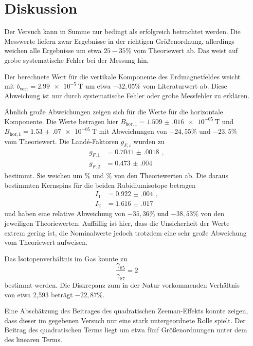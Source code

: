 \newpage
\section{Diskussion}
\label{sec:Diskussion}

Der Versuch kann in Summe nur bedingt als erfolgreich betrachtet werden. Die Messwerte
liefern zwar Ergebnisse in der richtigen Größenordnung, allerdings weichen alle Ergebnisse um
etwa $25-35\%$ vom Theoriewert ab. Das weist auf grobe systematische Fehler bei der Messung hin.

Der berechnete Wert für die vertikale Komponente des Erdmagnetfeldes weicht mit
$b_{\text{vert}}=\SI{2.99e-5}{\tesla}$ um etwa $-32{,}05\%$ vom Literaturwert ab. Diese Abweichung
ist nur durch systematische Fehler oder grobe Messfehler zu erklären.

Ähnlich große Abweichungen zeigen sich für die Werte für die horizontale Komponente.
Die Werte betragen hier $B_{\text{hor},1}=\SI{1.509(016)e-05}{\tesla}$ und
$B_{\text{hor},1}=\SI{1.53(07)e-05}{\tesla}$ mit Abweichungen von $-24{,}55\%$ und $-23{,}5\%$
vom Theoriewert. Die Landé-Faktoren $g_{F,i}$ wurden zu
\begin{align*}
  g_{F,1}&= \SI{0.7041(0018)}{}\,,\\
  g_{F,2}&= \SI{0.473(004)}{}
\end{align*}
bestimmt. Sie weichen um $\%$ und $\%$ von den Theoriewerten ab.
Die daraus bestimmten Kernspins für die beiden Rubidiumisotope betragen
\begin{align*}
  I_1&= \SI{0.922(004)}{}\,,\\
  I_2&= \SI{1.616(017)}{}
\end{align*}
und haben eine relative Abweichung von $-35{,}36\%$ und $-38{,}53\%$ von den jeweiligen
Theoriewerten. Auffällig ist hier, dass die Unsicherheit der Werte extrem gering ist,
die Nominalwerte jedoch trotzdem eine sehr große Abweichung vom Theoriewert aufweisen.

Das Isotopenverhältnis im Gas konnte zu
\begin{equation}
  \frac{\gamma_{85}}{\gamma_{87}}= 2
\end{equation}
bestimmt werden. Die Diskrepanz zum in der Natur vorkommenden Verhältnis von
etwa 2{,}593 beträgt $-22{,}87\%$.

Eine Abschätzung des Beitrages des quadratischen Zeeman-Effekts konnte zeigen, dass
dieser im gegebenen Versuch nur eine stark untergeordnete Rolle spielt. Der Beitrag des
quadratischen Terms liegt um etwa fünf Größenordnungen unter dem des linearen Terms.

